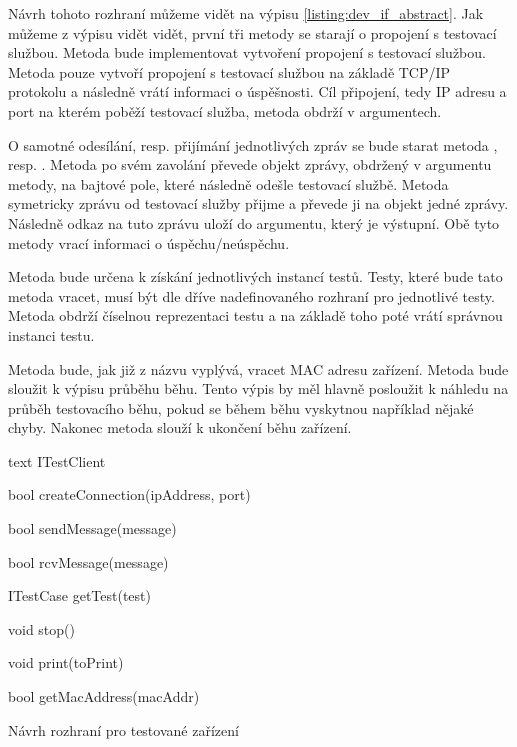 Návrh tohoto rozhraní můžeme vidět na výpisu \ref{listing:dev_if_abstract}. Jak můžeme z výpisu vidět vidět, první tři metody se starají o propojení s testovací službou. Metoda  bude implementovat vytvoření propojení s testovací službou. Metoda pouze vytvoří propojení s testovací službou na základě TCP/IP protokolu a následně vrátí informaci o úspěšnosti. Cíl připojení, tedy IP adresu a port na kterém poběží testovací služba, metoda obdrží v argumentech.

O samotné odesílání, resp. přijímání jednotlivých zpráv se bude starat metoda , resp. . Metoda  po svém zavolání převede objekt zprávy, obdržený v argumentu metody, na bajtové pole, které následně odešle testovací službě. Metoda  symetricky zprávu od testovací služby přijme a převede ji na objekt jedné zprávy. Následně odkaz na tuto zprávu uloží do argumentu, který je výstupní. Obě tyto metody vrací informaci o úspěchu/neúspěchu.

Metoda  bude určena k získání jednotlivých instancí testů. Testy, které bude tato metoda vracet, musí být dle dříve nadefinovaného rozhraní pro jednotlivé testy. Metoda obdrží číselnou reprezentaci testu a na základě toho poté vrátí správnou instanci testu. 

Metoda  bude, jak již z názvu vyplývá, vracet MAC adresu zařízení. Metoda  bude sloužit k výpisu průběhu běhu. Tento výpis by měl hlavně posloužit k náhledu na průběh testovacího běhu, pokud se během běhu vyskytnou například nějaké chyby. Nakonec metoda  slouží k ukončení běhu zařízení.


\begin{listing}[htbp]
    \centering
    \begin{cminted}[breaklines]{text}
ITestClient 
{
    bool createConnection(ipAddress, port)

    bool sendMessage(message)

    bool rcvMessage(message)

    ITestCase getTest(test)

    void stop()

    void print(toPrint)

    bool getMacAddress(macAddr)
}
    \end{cminted}
\caption{Návrh rozhraní pro testované zařízení}
\label{listing:dev_if_abstract}
\end{listing}

